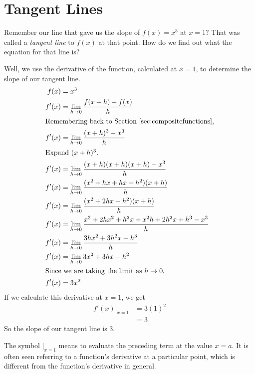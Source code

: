 \section{Tangent Lines}

Remember our line that gave us the slope of $f(x)=x^3$ at $x=1$?
That was called a \emph{tangent line} to $f(x)$ at that point.
How do we find out what the equation for that line is?

Well, we use the derivative of the function, calculated at $x=1$, to determine the slope of our tangent line.
\begin{align*}
  f(x)&=x^3\\
  f'(x)&=\lim_{h \to 0} \frac{f(x+h)-f(x)}{h} \\
  \intertext{Remembering back to \secref{sec:compositefunctions},}
  f'(x)&=\lim_{h \to 0} \frac{(x+h)^3-x^3}{h} \\
  \intertext{Expand $(x+h)^3$.}
  f'(x)&=\lim_{h \to 0} \frac{(x+h)(x+h)(x+h)-x^3}{h} \\
  f'(x)&=\lim_{h \to 0} \frac{(x^2+hx+hx+h^2)(x+h)}{h} \\
  f'(x)&=\lim_{h \to 0} \frac{(x^2+2hx+h^2)(x+h)}{h} \\
  f'(x)&=\lim_{h \to 0} \frac{x^3+2hx^2+h^2x+x^2h+2h^2x+h^3-x^3}{h} \\
  f'(x)&=\lim_{h \to 0} \frac{3hx^2+3h^2x+h^3}{h} \\
  f'(x)&=\lim_{h \to 0} 3x^2+3hx+h^2 \\
  \intertext{Since we are taking the limit as $h\to0$,}
  f'(x)&=3x^2
\end{align*}
If we calculate this derivative at $x=1$, we get
\begin{align*}
  f'(x)\Big|_{x=1}&=3(1)^2 \\
  &=3
\end{align*}
So the slope of our tangent line is $3$.
\begin{note}
  The symbol $\big|_{x=1}$ means to evaluate the preceding term at the value $x=a$.
  It is often seen referring to a function's derivative at a particular point, which is different from the function's derivative in general.
\end{note}

